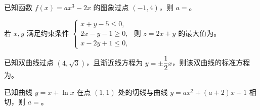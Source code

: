 \begin{question}
已知函数 $f(x)=ax^3-2x$ 的图象过点 $(-1,4)$，则 $a=$\gkblank{}。

\end{question}
\begin{question}
若 $x,y$ 满足约束条件 $\begin{cases}x+y-5\le0,\\2x-y-1\ge0,\\x-2y+1\le0,\end{cases}$ 则 $z=2x+y$ 的最大值为\gkblank{}。

\end{question}
\begin{question}
已知双曲线过点 $(4,\sqrt3)$，且渐近线方程为 $y=\pm\dfrac12x$，则该双曲线的标准方程为\gkblank{}。

\end{question}
\begin{question}
已知曲线 $y=x+\ln x$ 在点 $(1,1)$ 处的切线与曲线 $y=ax^2+(a+2)x+1$ 相切，则 $a=$\gkblank{}。

\end{question}

